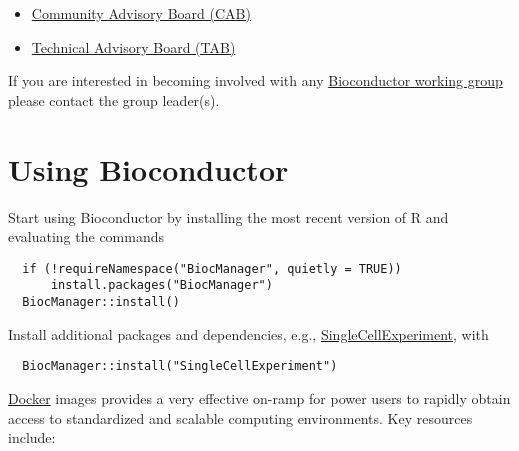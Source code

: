 \begin{itemize}
\tightlist
\item
  \href{https://bioconductor.org/about/community-advisory-board/}{Community Advisory Board (CAB)}
\item
  \href{https://bioconductor.org/about/technical-advisory-board/}{Technical Advisory Board (TAB)}
\end{itemize}

If you are interested in becoming involved with any \href{https://workinggroups.bioconductor.org/currently-active-working-groups-committees.html}{Bioconductor working group} please contact the group leader(s).

\hypertarget{using-bioconductor}{%
\section{Using Bioconductor}\label{using-bioconductor}}

Start using
Bioconductor by installing the most recent version of R and evaluating
the commands

\begin{verbatim}
  if (!requireNamespace("BiocManager", quietly = TRUE))
      install.packages("BiocManager")
  BiocManager::install()
\end{verbatim}

Install additional packages and dependencies,
e.g., \href{https://bioconductor.org/packages/SingleCellExperiment}{SingleCellExperiment}, with

\begin{verbatim}
  BiocManager::install("SingleCellExperiment")
\end{verbatim}

\href{https://bioconductor.org/help/docker/}{Docker}
images provides a very effective on-ramp for power users to rapidly
obtain access to standardized and scalable computing environments.
Key resources include:

